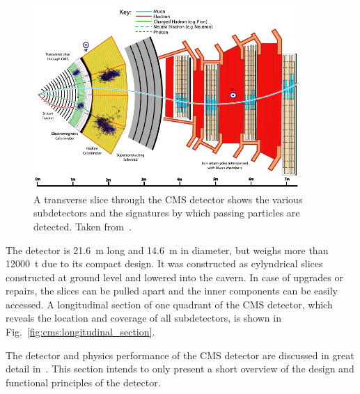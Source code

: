 \begin{figure}[htp]
    \centering
    \includegraphics[width=0.9\textwidth]{figures/cms_detector/cms_slice.pdf}
    \caption[Transverse slice of the CMS detector]{A transverse slice through the
        CMS detector shows the various subdetectors and the signatures by which
        passing particles are detected. Taken from~\cite{Barney:2120661}.}
    \label{fig:cms:transverse_slice}
\end{figure}

The detector is \SI{21.6}{\meter} long and \SI{14.6}{\meter} in diameter, but
weighs more than \SI{12000}{\tonne} due to its compact design. It was
constructed as cylyndrical slices constructed at ground level and lowered into
the cavern. In case of upgrades or repairs, the slices can be pulled apart and
the inner components can be easily accessed. A longitudinal section of one
quadrant of the CMS detector, which reveals the location and coverage of all
subdetectors, is shown in Fig.~\ref{fig:cms:longitudinal_section}.

The detector and physics performance of the CMS detector are discussed in great
detail in~\cite{Bayatian:922757,Ball:2007zza,Chatrchyan:2008aa}. This section
intends to only present a short overview of the design and functional principles
of the detector.

